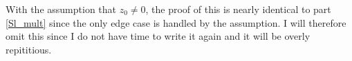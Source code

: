 
With the assumption that $z_0 \neq 0$, the proof of this is nearly identical to part \ref{Sl_mult} since the only edge case is handled by the assumption.
I will therefore omit this since I do not have time to write it again and it will be overly repititious.
